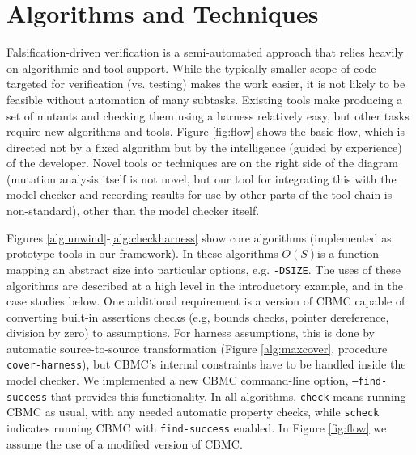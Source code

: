 \documentclass{svjour3}
\begin{document}
\section{Algorithms and Techniques}
\label{sec:algs}

Falsification-driven verification is a semi-automated approach that
relies heavily on algorithmic and tool support.  While the typically
smaller scope of code targeted for verification (vs. testing) makes the work easier,
it is not likely to be feasible without automation of many
subtasks. Existing tools make producing a set of mutants and checking
them using a harness relatively easy, but other tasks require new algorithms
and tools.  Figure \ref{fig:flow} shows the basic flow, which is directed
not by a fixed algorithm but by the intelligence (guided by experience)
\cite{NeroWolfe} of the
developer.  Novel tools or techniques are on the right side of the
diagram (mutation analysis itself is not novel, but our tool for integrating
this with the model checker and recording results for use by other
parts of the tool-chain is non-standard), other than the model checker
itself. 

Figures \ref{alg:unwind}-\ref{alg:checkharness} show core algorithms
(implemented as prototype tools in our framework).  In these
algorithms $O(S)$is a function mapping an abstract size into
particular options, e.g. {\tt -DSIZE}. The uses of these algorithms
are described at a high level in the introductory example, and in the
case studies below.  One additional requirement is a version of CBMC
capable of converting built-in assertions checks (e.g, bounds checks,
pointer dereference, division by zero) to assumptions.  For harness
assumptions, this is done by automatic source-to-source transformation
(Figure \ref{alg:maxcover}, procedure {\tt cover-harness}), but CBMC's internal constraints have to be
handled inside the model checker.  We implemented a new CBMC
command-line option, {\tt --find-success} that provides this
functionality.  In all algorithms, {\tt check} means running CBMC as
usual, with any needed automatic property checks, while {\tt scheck}
indicates running CBMC with {\tt find-success} enabled.  In Figure
\ref{fig:flow} we assume the use of a modified version of CBMC.
\end{document}
